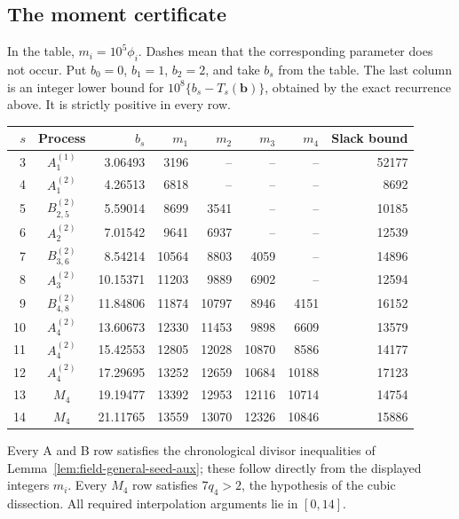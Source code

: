 \documentclass[11pt]{amsart}
\theoremstyle{definition}
\numberwithin{equation}{section}
\begin{document}
\subsection{The moment certificate}


In the table, $m_i=10^5\phi_i$.  Dashes mean that the corresponding parameter
does not occur.  Put $b_0=0$, $b_1=1$, $b_2=2$, and take $b_s$ from the table.
The last column is an integer lower bound for
$10^8\{b_s-T_s(\boldsymbol b)\}$, obtained by the exact recurrence
above.  It is strictly positive in every row.

\begin{center}
\small
\begin{tabular}{r c r r r r r r}
\hline
$s$ & Process & $b_s$ & $m_1$ & $m_2$ & $m_3$ & $m_4$ & Slack bound\\
\hline
3 & $A_{1}^{(1)}$ & 3.06493 & 3196 & -- & -- & -- & 52177 \\
4 & $A_{1}^{(2)}$ & 4.26513 & 6818 & -- & -- & -- & 8692 \\
5 & $B_{2,5}^{(2)}$ & 5.59014 & 8699 & 3541 & -- & -- & 10185 \\
6 & $A_{2}^{(2)}$ & 7.01542 & 9641 & 6937 & -- & -- & 12539 \\
7 & $B_{3,6}^{(2)}$ & 8.54214 & 10564 & 8803 & 4059 & -- & 14896 \\
8 & $A_{3}^{(2)}$ & 10.15371 & 11203 & 9889 & 6902 & -- & 12594 \\
9 & $B_{4,8}^{(2)}$ & 11.84806 & 11874 & 10797 & 8946 & 4151 & 16152 \\
10 & $A_{4}^{(2)}$ & 13.60673 & 12330 & 11453 & 9898 & 6609 & 13579 \\
11 & $A_{4}^{(2)}$ & 15.42553 & 12805 & 12028 & 10870 & 8586 & 14177 \\
12 & $A_{4}^{(2)}$ & 17.29695 & 13252 & 12659 & 10684 & 10188 & 17123 \\
13 & $M_4$ & 19.19477 & 13392 & 12953 & 12116 & 10714 & 14754 \\
14 & $M_4$ & 21.11765 & 13559 & 13070 & 12326 & 10846 & 15886 \\
\hline
\end{tabular}
\end{center}

Every A and B row satisfies the chronological divisor inequalities
of Lemma~\ref{lem:field-general-seed-aux}; these follow directly from
the displayed integers $m_i$.  Every $M_4$ row satisfies $7q_4>2$, the hypothesis of the cubic
dissection.  All required interpolation arguments lie in $[0,14]$.
\end{document}
